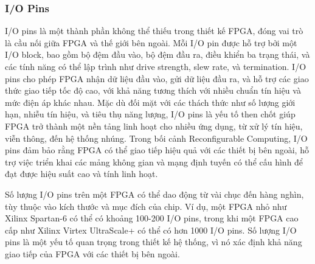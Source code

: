 \documentclass[a4paper]{article}
\begin{document}
\subsubsection{I/O Pins} 
I/O pins là một thành phần không thể thiếu trong thiết kế FPGA, đóng vai trò là cầu nối giữa FPGA và thế giới bên ngoài. Mỗi I/O pin được hỗ trợ bởi một I/O block, bao gồm bộ đệm đầu vào, bộ đệm đầu ra, điều khiển ba trạng thái, và các tính năng có thể lập trình như drive strength, slew rate, và termination. I/O pins cho phép FPGA nhận dữ liệu đầu vào, gửi dữ liệu đầu ra, và hỗ trợ các giao thức giao tiếp tốc độ cao, với khả năng tương thích với nhiều chuẩn tín hiệu và mức điện áp khác nhau. Mặc dù đối mặt với các thách thức như số lượng giới hạn, nhiễu tín hiệu, và tiêu thụ năng lượng, I/O pins là yếu tố then chốt giúp FPGA trở thành một nền tảng linh hoạt cho nhiều ứng dụng, từ xử lý tín hiệu, viễn thông, đến hệ thống nhúng. Trong bối cảnh Reconfigurable Computing, I/O pins đảm bảo rằng FPGA có thể giao tiếp hiệu quả với các thiết bị bên ngoài, hỗ trợ việc triển khai các mảng không gian và mạng định tuyến có thể cấu hình để đạt được hiệu suất cao và tính linh hoạt.

Số lượng I/O pins trên một FPGA có thể dao động từ vài chục đến hàng nghìn, tùy thuộc vào kích thước và mục đích của chip. Ví dụ, một FPGA nhỏ như Xilinx Spartan-6 có thể có khoảng 100-200 I/O pins, trong khi một FPGA cao cấp như Xilinx Virtex UltraScale+ có thể có hơn 1000 I/O pins. Số lượng I/O pins là một yếu tố quan trọng trong thiết kế hệ thống, vì nó xác định khả năng giao tiếp của FPGA với các thiết bị bên ngoài.
\end{document}
